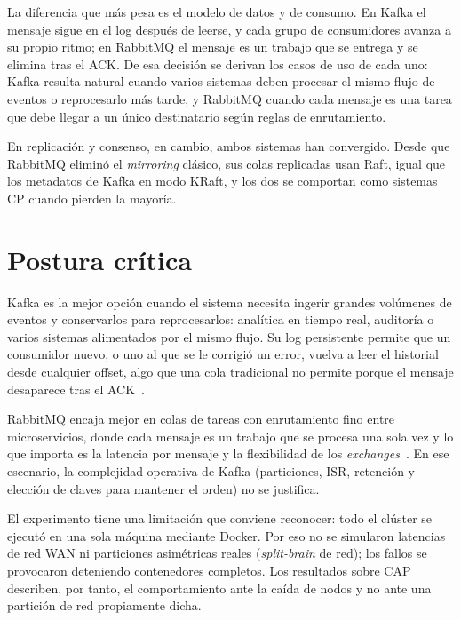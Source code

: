 \documentclass[12pt,a4paper]{article}
\begin{document}
La diferencia que más pesa es el modelo de datos y de consumo. En Kafka el mensaje sigue en el log después de leerse, y cada grupo de consumidores avanza a su propio ritmo; en RabbitMQ el mensaje es un trabajo que se entrega y se elimina tras el ACK. De esa decisión se derivan los casos de uso de cada uno: Kafka resulta natural cuando varios sistemas deben procesar el mismo flujo de eventos o reprocesarlo más tarde, y RabbitMQ cuando cada mensaje es una tarea que debe llegar a un único destinatario según reglas de enrutamiento.

En replicación y consenso, en cambio, ambos sistemas han convergido. Desde que RabbitMQ eliminó el \textit{mirroring} clásico, sus colas replicadas usan Raft, igual que los metadatos de Kafka en modo KRaft, y los dos se comportan como sistemas CP cuando pierden la mayoría.

\section{Postura crítica}\label{sec:postura}
Kafka es la mejor opción cuando el sistema necesita ingerir grandes volúmenes de eventos y conservarlos para reprocesarlos: analítica en tiempo real, auditoría o varios sistemas alimentados por el mismo flujo. Su log persistente permite que un consumidor nuevo, o uno al que se le corrigió un error, vuelva a leer el historial desde cualquier offset, algo que una cola tradicional no permite porque el mensaje desaparece tras el ACK~\cite{Maharjan2023,Ramadan2026}.

RabbitMQ encaja mejor en colas de tareas con enrutamiento fino entre microservicios, donde cada mensaje es un trabajo que se procesa una sola vez y lo que importa es la latencia por mensaje y la flexibilidad de los \textit{exchanges}~\cite{Kaminski2025}. En ese escenario, la complejidad operativa de Kafka (particiones, ISR, retención y elección de claves para mantener el orden) no se justifica.

El experimento tiene una limitación que conviene reconocer: todo el clúster se ejecutó en una sola máquina mediante Docker. Por eso no se simularon latencias de red WAN ni particiones asimétricas reales (\textit{split-brain} de red); los fallos se provocaron deteniendo contenedores completos. Los resultados sobre CAP describen, por tanto, el comportamiento ante la caída de nodos y no ante una partición de red propiamente dicha.
\end{document}
